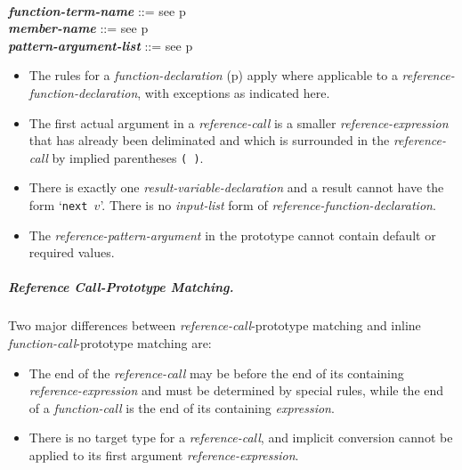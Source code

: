 \documentclass[12pt]{article}
\newcommand{\subsubsubsubsection}[1]{\subparagraph[#1]{#1.}}
\newcommand{\emkey}[1]{{\em \bfseries #1}}
\newcommand{\pagref}[1]{p\pageref{#1}}
\newenvironment{indpar}[1][0.3in]%
	{\begin{list}{}%
		     {\setlength{\itemsep}{0in}%
		      \setlength{\topsep}{0in}%
		      \setlength{\parsep}{1ex}%
		      \setlength{\labelwidth}{#1}%
		      \setlength{\leftmargin}{#1}%
		      \addtolength{\leftmargin}{\labelsep}}%
	 \item}%
	{\end{list}}
\begin{document}
\begin{indpar}[0.1in]
\\[0.5ex]
\emkey{function-term-name} ::= see \pagref{FUNCTION-TERM-NAME}
\\[0.5ex]
\emkey{member-name} ::= see \pagref{MEMBER-NAME}
\\[0.5ex]
\emkey{pattern-argument-list} ::= see \pagref{PATTERN-ARGUMENT-LIST}
\begin{itemize}
\item
The rules for a {\em function-declaration}
(\pagref{FUNCTION-DECLARATION-RULES})
apply where applicable to a {\em reference-function-declaration},
with exceptions as indicated here.
\item
The first actual argument in a {\em reference-call} is a
smaller {\em reference-expression} that has already been deliminated
and which is surrounded in the {\em reference-call} by implied
parentheses {\tt (~)}.
\item
There is exactly one {\em result-variable-declaration} and a result
cannot have the form `{\tt next $v$}'.  There is no {\em input-list}
form of {\em reference-function-declaration}.
\item
The {\em reference-pattern-argument} in the prototype cannot
contain default or required values.
\end{itemize}
\end{indpar}

\subsubsubsubsection{Reference Call-Prototype Matching}
\label{REFERENCE-CALL-PROTOTYPE-MATCHING}

Two major differences between {\em refer\-ence-call}-prototype
matching and inline {\em function-call}-prototype matching are:
\begin{itemize}
\item
The end of the {\em reference-call} may be before the end
of its containing {\em reference-expres\-sion} and must be
determined by special rules, while the
end of a {\em function-call} is the end of its containing
{\em expression}.
\item
There is no target type for a {\em reference-call}, and
implicit conversion cannot be applied to its first argument
{\em reference-expression}.
\end{itemize}
\end{document}

